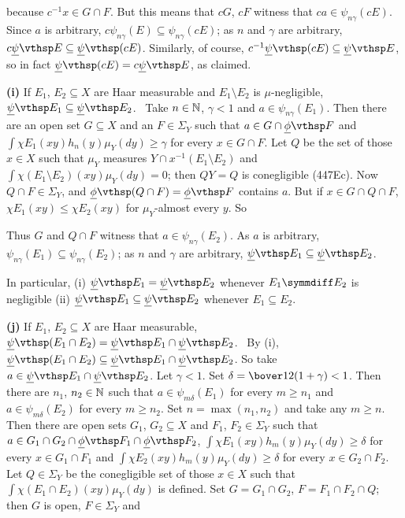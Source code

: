 {\noindent because $c^{-1}x\in G\cap F$.   But this means that $cG$, $cF$
witness that $ca\in\psi_{n\gamma}(cE)$.   Since $a$ is arbitrary,
$c\psi_{n\gamma}(E)\subseteq\psi_{n\gamma}(cE)$;  as $n$ and $\gamma$
are arbitrary, $c\undpsi E\subseteq\undpsi(cE)$.   Similarly, of course,
$c^{-1}\undpsi(cE)\subseteq\undpsi E$, so in fact
$\undpsi(cE)=c\undpsi E$, as claimed.\ \Qed

\medskip

{\bf (i)} If $E_1$, $E_2\subseteq X$ are Haar measurable and
$E_1\setminus E_2$ is $\mu$-negligible,
$\undpsi E_1\subseteq\undpsi E_2$.   \Prf\ Take $n\in\Bbb N$, $\gamma<1$
and $a\in\psi_{n\gamma}(E_1)$.   Then there are an open set
$G\subseteq X$
and an $F\in\Sigma_Y$ such that $a\in G\cap\undphi F$ and
$\int\chi E_1(xy)h_n(y)\mu_Y(dy)\ge\gamma$ for every $x\in G\cap F$.
Let $Q$ be the set of those $x\in X$ such that
$\mu_Y$ measures $Y\cap x^{-1}(E_1\setminus E_2)$ and
$\int\chi(E_1\setminus E_2)(xy)\mu_Y(dy)=0$;  then $QY=Q$ is
conegligible (447Ec).   Now $Q\cap F\in\Sigma_Y$, and
$\undphi(Q\cap F)=\undphi F$ contains $a$.   But if $x\in G\cap Q\cap F$, $\chi E_1(xy)\le\chi E_2(xy)$ for $\mu_Y$-almost every $y$.   So


\noindent Thus $G$ and $Q\cap F$ witness that $a\in\psi_{n\gamma}(E_2)$.
As $a$ is arbitrary, $\psi_{n\gamma}(E_1)\subseteq\psi_{n\gamma}(E_2)$;
as $n$ and $\gamma$ are arbitrary, $\undpsi E_1\subseteq\undpsi E_2$.\
\Qed

In particular, (i) $\undpsi E_1=\undpsi E_2$ whenever $E_1\symmdiff E_2$
is negligible (ii) $\undpsi E_1\subseteq\undpsi E_2$ whenever
$E_1\subseteq E_2$.

\medskip

{\bf (j)} If $E_1$, $E_2\subseteq X$ are Haar measurable,
$\undpsi(E_1\cap E_2)=\undpsi E_1\cap\undpsi E_2$.   \Prf\ By (i),
$\undpsi(E_1\cap E_2)\subseteq\undpsi E_1\cap\undpsi E_2$.   So take
$a\in\undpsi E_1\cap\undpsi E_2$.   Let $\gamma<1$.   Set
$\delta=\bover12(1+\gamma)<1$.   Then there are $n_1$, $n_2\in\Bbb N$
such that $a\in\psi_{m\delta}(E_1)$ for every $m\ge n_1$ and
$a\in\psi_{m\delta}(E_2)$ for every $m\ge n_2$.   Set $n=\max(n_1,n_2)$
and take any $m\ge n$.   Then there are open sets $G_1$,
$G_2\subseteq X$ and $F_1$, $F_2\in\Sigma_Y$ such that
$a\in G_1\cap G_2\cap\undphi F_1\cap\undphi F_2$,
$\int\chi E_1(xy)h_m(y)\mu_Y(dy)\ge\delta$ for
every $x\in G_1\cap F_1$ and $\int\chi E_2(xy)h_m(y)\mu_Y(dy)\ge\delta$ for
every $x\in G_2\cap F_2$.   Let $Q\in\Sigma_Y$ be the conegligible set
of those $x\in X$ such that $\int\chi(E_1\cap E_2)(xy)\mu_Y(dy)$
is defined.   Set $G=G_1\cap G_2$, $F=F_1\cap F_2\cap Q$;  then $G$ is
open, $F\in\Sigma_Y$ and

}
